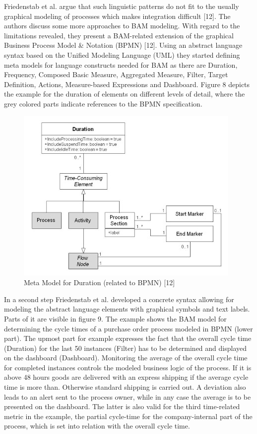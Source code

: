 Friedenstab et al. argue that such linguistic patterns do not fit to the usually graphical modeling of processes which makes integration difficult [12]. The authors discuss some more approaches to BAM modeling. With regard to the limitations revealed, they present a BAM-related extension of the graphical Business Process Model & Notation (BPMN) [12].
Using an abstract language syntax based on the Unified Modeling Language (UML) they started defining meta models for language constructs needed for BAM as there are Duration, Frequency, Composed Basic Measure, Aggregated Measure, Filter, Target Definition, Actions, Measure-based Expressions and Dashboard. Figure 8 depicts the example for the duration of elements on different levels of detail, where the grey colored parts indicate references to the BPMN specification.

\begin{figure}[h]
	\centering
	\includegraphics[width=0.9\linewidth]{Figures/Chapter5/Monitoring/Meta-Mode-fo-Duration-relate-to-BPMN-1.jpg}
	\caption[Meta Model for Duration (related to BPMN) 12]{Meta Model for Duration (related to BPMN) [12]}
	\label{fig:Meta-Model}
\end{figure}


In a second step Friedenstab et al. developed a concrete syntax allowing for modeling the abstract language elements with graphical symbols and text labels. Parts of it are visible in figure 9. The example shows the BAM model for determining the cycle times of a purchase order process modeled in BPMN (lower part). The upmost part for example expresses the fact that the overall cycle time (Duration) for the last 50 instances (Filter) has to be determined and displayed on the dashboard (Dashboard). Monitoring the average of the overall cycle time for completed instances controls the modeled business logic of the process. If it is above 48 hours goods are delivered with an express shipping if the average cycle time is more than. Otherwise standard shipping is carried out. A deviation also leads to an alert sent to the process owner, while in any case the average is to be presented on the dashboard. The latter is also valid for the third time-related metric in the example, the partial cycle-time for the company-internal part of the process, which is set into relation with the overall cycle time.

